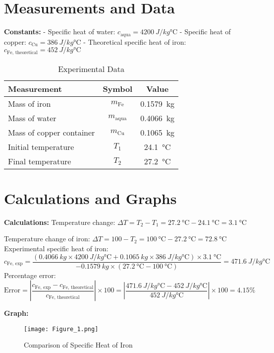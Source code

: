 \documentclass[12pt, a4paper]{article}
\begin{document}
\section{Measurements and Data}
\textbf{Constants:}  
- Specific heat of water: $c_{\text{aqua}} = \SI{4200}{J/kg\celsius}$  
- Specific heat of copper: $c_{\text{Cu}} = \SI{386}{J/kg\celsius}$  
- Theoretical specific heat of iron: $c_{\text{Fe, theoretical}} = \SI{452}{J/kg\celsius}$

\begin{table}[h]
\centering
\begin{tabular}{|l|c|c|}
\hline
\textbf{Measurement} & \textbf{Symbol} & \textbf{Value} \\
\hline
Mass of iron & $m_{\text{Fe}}$ & \SI{0.1579}{kg} \\
Mass of water & $m_{\text{aqua}}$ & \SI{0.4066}{kg} \\
Mass of copper container & $m_{\text{Cu}}$ & \SI{0.1065}{kg} \\
Initial temperature & $T_1$ & \SI{24.1}{\celsius} \\
Final temperature & $T_2$ & \SI{27.2}{\celsius} \\
\hline
\end{tabular}
\caption{Experimental Data}
\label{tab:measurements}
\end{table}

\section{Calculations and Graphs}
\textbf{Calculations:}  
Temperature change: $\Delta T = T_2 - T_1 = \SI{27.2}{\celsius} - \SI{24.1}{\celsius} = \SI{3.1}{\celsius}$  

Temperature change of iron: $\Delta T = 100 - T_2 = \SI{100}{\celsius} - \SI{27.2}{\celsius} = \SI{72.8}{\celsius}$  
Experimental specific heat of iron:  
  \[
  c_{\text{Fe, exp}} = \frac{(\SI{0.4066}{kg} \times \SI{4200}{J/kg\celsius} + \SI{0.1065}{kg} \times \SI{386}{J/kg\celsius}) \times \SI{3.1}{\celsius}}{-\SI{0.1579}{kg} \times (\SI{27.2}{\celsius} - \SI{100}{\celsius})} = \SI{471.6}{J/kg\celsius}
  \]
Percentage error:  
  \[
  \text{Error} = \left| \frac{c_{\text{Fe, exp}} - c_{\text{Fe, theoretical}}}{c_{\text{Fe, theoretical}}} \right| \times 100 = \left| \frac{\SI{471.6}{J/kg\celsius} - \SI{452}{J/kg\celsius}}{\SI{452}{J/kg\celsius}} \right| \times 100 = 4.15\%
  \]

\textbf{Graph:}  
\begin{figure}[H]
	\centering
	\texttt{[image: Figure\_1.png]}
	\caption{Comparison of Specific Heat of Iron}
	\label{fig:comparison}
\end{figure}
\end{document}
